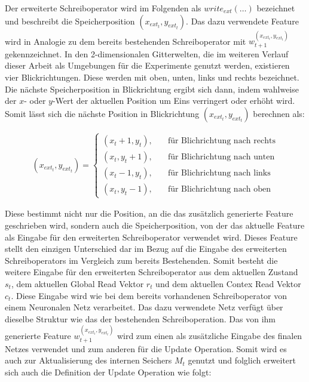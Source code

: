 Der erweiterte Schreiboperator wird im Folgenden als $write_{ext}(\dots)$ bezeichnet und beschreibt die Speicherposition $(x_{ext_t},y_{ext_t})$. Das dazu verwendete Feature wird in Analogie zu dem bereits bestehenden Schreiboperator mit $w_{t+1}^{(x_{ext_t},y_{ext_t})}$ gekennzeichnet. In den 2-dimensionalen Gitterwelten, die im weiteren Verlauf dieser Arbeit als Umgebungen für die Experimente genutzt werden, existieren vier Blickrichtungen. Diese werden mit oben, unten, links und rechts bezeichnet. Die nächste Speicherposition in Blickrichtung ergibt sich dann, indem wahlweise der $x$- oder $y$-Wert der aktuellen Position um Eins verringert oder erhöht wird. Somit lässt sich die nächste Position in Blickrichtung $(x_{ext_t},y_{ext_t})$ berechnen als:

\begin{equation}
\begin{aligned}
(x_{ext_t}, y_{ext_t}) =
\begin{cases}
(x_t + 1,y_t), & \quad \text{für Blichrichtung nach rechts} \\
(x_t,y_t + 1), & \quad \text{für Blichrichtung nach unten} \\
(x_t - 1,y_t), & \quad \text{für Blichrichtung nach links} \\
(x_t,y_t - 1), & \quad \text{für Blichrichtung nach oben}
\end{cases}
\end{aligned}
\end{equation}

Diese bestimmt nicht nur die Position, an die das zusätzlich generierte Feature geschrieben wird, sondern auch die Speicherposition, von der das aktuelle Feature als Eingabe für den erweiterten Schreiboperator verwendet wird. Dieses Feature stellt den einzigen Unterschied dar im Bezug auf die Eingabe des erweiterten Schreiboperators im Vergleich zum bereits Bestehenden. Somit besteht die weitere Eingabe für den erweiterten Schreiboperator aus dem aktuellen Zustand $s_t$, dem aktuellen Global Read Vektor $r_t$ und dem aktuellen Contex Read Vektor $c_t$.
Diese Eingabe wird wie bei dem bereits vorhandenen Schreiboperator von einem Neuronalen Netz verarbeitet. Das dazu verwendete Netz verfügt über dieselbe Struktur wie das der bestehenden Schreiboperation. Das von ihm generierte Feature $w_{t+1}^{(x_{ext_t},y_{ext_t})}$ wird zum einen als zusätzliche Eingabe des finalen Netzes verwendet und zum anderen für die Update Operation. Somit wird es auch zur Aktualisierung des internen Seichers $M_t$ genutzt und folglich erweitert sich auch die Definition der Update Operation wie folgt:

